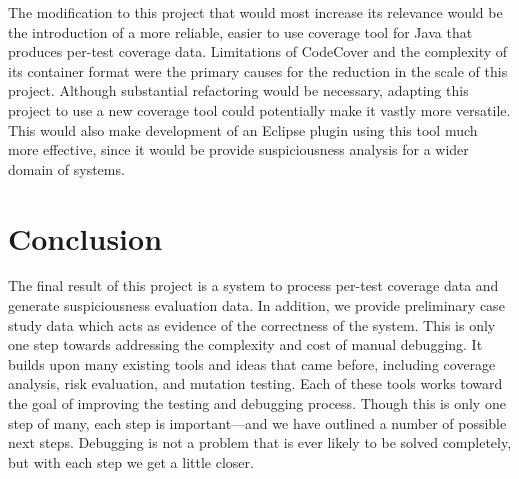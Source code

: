 The modification to this project that would most increase its relevance would be the introduction
of a more reliable, easier to use coverage tool for Java that produces per-test coverage data.
Limitations of CodeCover and the complexity of its container format were the primary causes
for the reduction in the scale of this project.  Although substantial refactoring would be
necessary, adapting this project to use a new coverage tool could potentially make it vastly 
more versatile.  This would also make development of an Eclipse plugin using this tool much
more effective, since it would be provide suspiciousness analysis for a wider domain of systems.

\section{Conclusion}\label{sec:end}

The final result of this project is a system to process per-test coverage data and generate
suspiciousness evaluation data.  In addition, we provide preliminary case study data which
acts as evidence of the correctness of the system.  This is only one step towards 
addressing the complexity and cost of manual debugging.  It builds upon many existing tools
and ideas that came before, including coverage analysis, risk evaluation, and mutation testing.
Each of these tools works toward the goal of improving the testing and debugging process.
Though this is only one step of many, each step is important---and we have outlined a number
of possible next steps.  Debugging is not a problem that is ever 
likely to be solved completely, but with each step we get a little closer.  